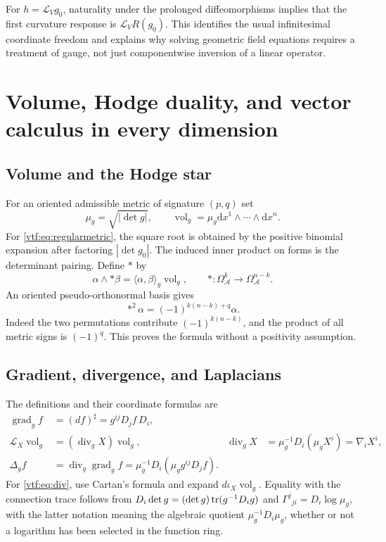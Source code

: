 \documentclass[11pt,letterpaper]{article}
\theoremstyle{definition}
\theoremstyle{remark}
\newcommand{\A}{\mathscr A}\newcommand{\OO}{\mathcal O}\newcommand{\mm}{\mathfrak m}
\newcommand{\grad}{\operatorname{grad}}\newcommand{\Div}{\operatorname{div}}
\newcommand{\vol}{\operatorname{vol}}\newcommand{\GL}{\operatorname{GL}}
\newcommand{\Lie}{\mathcal L}\newcommand{\HH}{\mathcal H}
\newcommand{\dd}{\mathrm d}
\begin{document}
For $h=\Lie_Vg_0$, naturality under the prolonged diffeomorphisms implies
that the first curvature response is $\Lie_VR(g_0)$. This identifies the
usual infinitesimal coordinate freedom and explains why solving geometric
field equations requires a treatment of gauge, not just componentwise
inversion of a linear operator.

\section{Volume, Hodge duality, and vector calculus in every dimension}\label{vtf:sec:hodge}

\subsection{Volume and the Hodge star}

For an oriented admissible metric of signature $(p,q)$ set
\[
 \mu_g=\sqrt{|\det g|},\qquad
 \vol_g=\mu_g\dd x^1\wedge\cdots\wedge\dd x^n.
\]
For \eqref{vtf:eq:regularmetric}, the square root is obtained by the positive
binomial expansion after factoring $|\det g_0|$. The induced inner product
on forms is the determinant pairing. Define $*$ by
\begin{equation}\label{vtf:eq:star}
 \alpha\wedge *\beta=\langle\alpha,\beta\rangle_g\vol_g,
 \qquad *:\Omega^k_\A\to\Omega^{n-k}_\A.
\end{equation}
An oriented pseudo-orthonormal basis gives
\begin{equation}\label{vtf:eq:star2}
 *^2\alpha=(-1)^{k(n-k)+q}\alpha.
\end{equation}
Indeed the two permutations contribute $(-1)^{k(n-k)}$, and the product of
all metric signs is $(-1)^q$. This proves the formula without a positivity
assumption.

\subsection{Gradient, divergence, and Laplacians}

The definitions and their coordinate formulas are
\begin{align}
 \grad_g f&=(df)^\sharp=g^{ij}D_jf\,D_i,\label{vtf:eq:grad}\\
 \Lie_X\vol_g&=(\Div_gX)\vol_g,
 &\Div_gX&=\mu_g^{-1}D_i(\mu_gX^i)=\nabla_iX^i,\label{vtf:eq:div}\\
 \Delta_gf&=\Div_g\grad_gf
 =\mu_g^{-1}D_i(\mu_g g^{ij}D_jf).\label{vtf:eq:lap}
\end{align}
For \eqref{vtf:eq:div}, use Cartan's formula and expand
$d\iota_X\vol_g$. Equality with the connection trace follows from
$D_i\det g=(\det g)\operatorname{tr}(g^{-1}D_i g)$ and
$\Gamma^j{}_{ji}=D_i\log\mu_g$, with the latter notation meaning the
algebraic quotient $\mu_g^{-1}D_i\mu_g$, whether or not a logarithm has
been selected in the function ring.
\end{document}
